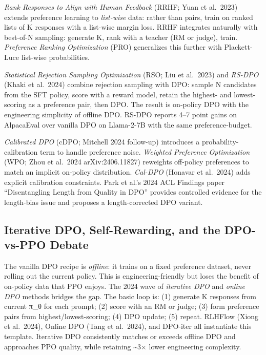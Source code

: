 \emph{Rank Responses to Align with Human Feedback} (RRHF; Yuan et al.~2023) extends preference learning to \emph{list-wise} data: rather than pairs, train on ranked lists of K responses with a list-wise margin loss. RRHF integrates naturally with best-of-N sampling: generate K, rank with a teacher (RM or judge), train. \emph{Preference Ranking Optimization} (PRO) generalizes this further with Plackett-Luce list-wise probabilities.

\emph{Statistical Rejection Sampling Optimization} (RSO; Liu et al.~2023) and \emph{RS-DPO} (Khaki et al.~2024) combine rejection sampling with DPO: sample N candidates from the SFT policy, score with a reward model, retain the highest- and lowest-scoring as a preference pair, then DPO. The result is on-policy DPO with the engineering simplicity of offline DPO. RS-DPO reports 4--7 point gains on AlpacaEval over vanilla DPO on Llama-2-7B with the same preference-budget.

\emph{Calibrated DPO} (cDPO; Mitchell 2024 follow-up) introduces a probability-calibration term to handle preference noise. \emph{Weighted Preference Optimization} (WPO; Zhou et al.~2024 arXiv:2406.11827) reweights off-policy preferences to match an implicit on-policy distribution. \emph{Cal-DPO} (Honavar et al.~2024) adds explicit calibration constraints. Park et al.'s 2024 ACL Findings paper ``Disentangling Length from Quality in DPO'' provides controlled evidence for the length-bias issue and proposes a length-corrected DPO variant.

\subsection{Iterative DPO, Self-Rewarding, and the DPO-vs-PPO Debate}\label{iterative-dpo-self-rewarding-and-the-dpo-vs-ppo-debate}

The vanilla DPO recipe is \emph{offline}: it trains on a fixed preference dataset, never rolling out the current policy. This is engineering-friendly but loses the benefit of on-policy data that PPO enjoys. The 2024 wave of \emph{iterative DPO} and \emph{online DPO} methods bridges the gap. The basic loop is: (1) generate K responses from current π\_θ for each prompt; (2) score with an RM or judge; (3) form preference pairs from highest/lowest-scoring; (4) DPO update; (5) repeat. RLHFlow (Xiong et al.~2024), Online DPO (Tang et al.~2024), and DPO-iter all instantiate this template. Iterative DPO consistently matches or exceeds offline DPO and approaches PPO quality, while retaining \textasciitilde3× lower engineering complexity.


